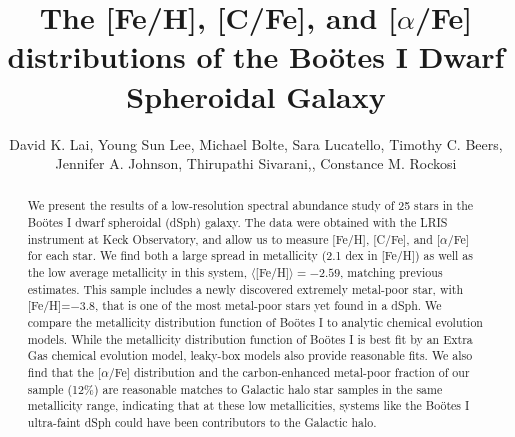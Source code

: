 \documentclass[iop]{emulateapj}
\def\bootes{Bo\"{o}tes I}
\begin{document}
\title{The [Fe/H], [C/Fe], and [$\alpha$/Fe] distributions of the Bo\"{o}tes I Dwarf Spheroidal Galaxy}

\author{David K. Lai{}, 
Young Sun Lee{},
Michael Bolte{},
Sara Lucatello{},
Timothy C. Beers{},
Jennifer A. Johnson{}, 
Thirupathi Sivarani,{},
Constance M. Rockosi{} }

\begin{abstract}

We present the results of a low-resolution spectral abundance study of
25 stars in the \bootes{} dwarf spheroidal (dSph) galaxy. The data
were obtained with the LRIS instrument at Keck Observatory, and
allow us to measure [Fe/H], [C/Fe], and [$\alpha$/Fe] for each
star. We find both a large spread in metallicity (2.1 dex in [Fe/H])
as well as the low average metallicity in this system,
$\langle$[Fe/H]$\rangle=-2.59$, matching previous estimates. This
sample includes a newly discovered extremely metal-poor star, with
[Fe/H]=$-3.8$, that is one of the most metal-poor stars yet found in a
dSph. We compare the metallicity distribution function of \bootes{} to
analytic chemical evolution models. While the metallicity distribution
function of \bootes{} is best fit by an Extra Gas chemical evolution
model, leaky-box models also provide reasonable fits. We also find
that the [$\alpha$/Fe] distribution and the carbon-enhanced metal-poor
fraction of our sample (12\%) are reasonable matches to Galactic halo
star samples in the same metallicity range, indicating that at these low
metallicities, systems like the \bootes{} ultra-faint dSph could have
been contributors to the Galactic halo.

\end{abstract}
\end{document}
